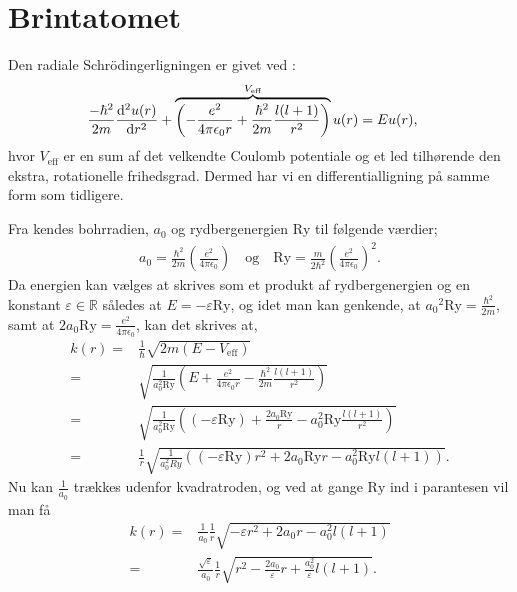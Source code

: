 \section{Brintatomet}
Den radiale Schrödingerligningen er givet ved \cite[s. 140]{griffiths}:
%
\begin{align}
    \frac{-\hbar^{2}}{2m}\diff[2]{u(r)}{r} + \overbrace{\left( - \frac{e^{2}}{4\pi\epsilon_{0}r} + \frac{\hbar^{2}}{2m}\frac{l(l+1)}{r^{2}} \right)}^{V_{\text{eff}}} u(r) &  = Eu(r),
\end{align}
%
hvor $V_{\text{eff}}$ er en sum af det velkendte Coulomb potentiale og et led tilhørende den ekstra, rotationelle frihedsgrad. Dermed har vi en differentialligning på samme form som tidligere.

Fra \cite{griffiths} kendes bohrradien, $a_{0}$ og rydbergenergien $\mathrm{Ry}$ til følgende værdier;
\begin{align}
    a_{0} = \frac{\hbar^{2}}{2m} {\left(\frac{e^{2}}{4\pi\epsilon_{0}} \right) \quad \text{og} \quad \mathrm{Ry} = \frac{m}{2\hbar^{2}}\left(\frac{e^{2}}{4\pi\epsilon_0} \right)}^{2}.
    \label{eq:konstanter}
\end{align}
%
Da energien kan vælges at skrives som et produkt af rydbergenergien og en konstant $\varepsilon \in \mathbb{R}$ således at $E=-\varepsilon \mathrm{Ry}$, og idet man kan genkende, at ${a_{0}}^{2}\mathrm{Ry} = \frac{\hbar^{2}}{2m}$, samt at $2a_{0}\mathrm{Ry} = \frac{e^{2}}{4\pi\epsilon_{0}}$, kan det skrives at,
\begin{align}
    k(r) = & \frac{1}{\hbar} \sqrt{2m\left( E - V_{\text{eff}} \right)}\\
    = & \sqrt{\frac{1}{a_{0}^{2}\mathrm{\mathrm{Ry}}} \left( E + \frac{e^{2}}{4\pi\epsilon_{0}r} - \frac{\hbar^{2}}{2m}\frac{l(l+1)}{r^{2}} \right)}\\
    = & \sqrt{\frac{1}{a_{0}^{2}\mathrm{Ry}} \left( (-\varepsilon \mathrm{Ry}) + \frac{2a_{0}\mathrm{Ry}}{r} - a_{0}^{2}\mathrm{Ry}\frac{l(l+1)}{r^{2}} \right)}\\
    = & \frac{1}{r} \sqrt{\frac{1}{a_{0}^{2}{Ry}} \left( (-\varepsilon \mathrm{Ry})r^{2} + 2a_{0}\mathrm{Ry} r - a_{0}^{2}\mathrm{Ry} l(l+1) \right)}.
\end{align}
Nu kan $\frac{1}{a_0}$ trækkes udenfor kvadratroden, og ved at gange $\mathrm{Ry}$ ind i parantesen vil man få
\begin{align}
    k(r) = & \frac{1}{a_0} \frac{1}{r} \sqrt{-\varepsilon r^2 + 2a_0r - a_0^2l(l+1)} \\
    = & \frac{\sqrt{\varepsilon}}{a_0} \frac{1}{r} \sqrt{r^2 - \frac{2a_0}{\varepsilon}r + \frac{a_0^2}{\varepsilon}l(l+1)}.
\end{align}
